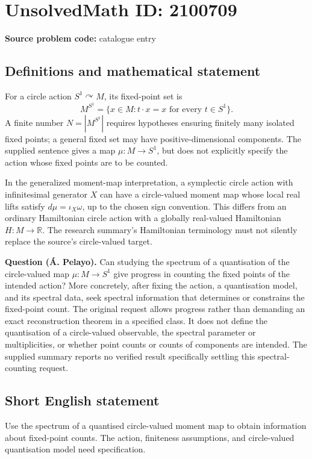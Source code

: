 \documentclass[11pt]{article}
\begin{document}
\section*{UnsolvedMath ID: 2100709}
\textbf{Source problem code:} catalogue entry
\subsection{Definitions and mathematical statement}
For a circle action $S^1\curvearrowright M$, its fixed-point set is
\[
M^{S^1}=\{x\in M:t\cdot x=x\text{ for every }t\in S^1\}.
\]
A finite number $N=|M^{S^1}|$ requires hypotheses ensuring finitely many isolated fixed points; a general fixed set may have positive-dimensional components. The supplied sentence gives a map $\mu:M\to S^1$, but does not explicitly specify the action whose fixed points are to be counted.

In the generalized moment-map interpretation, a symplectic circle action with infinitesimal generator $X$ can have a circle-valued moment map whose local real lifts satisfy $d\mu=\iota_X\omega$, up to the chosen sign convention. This differs from an ordinary Hamiltonian circle action with a globally real-valued Hamiltonian $H:M\to\mathbb R$. The research summary's Hamiltonian terminology must not silently replace the source's circle-valued target.

\textbf{Question (Á. Pelayo).} Can studying the spectrum of a quantisation of the circle-valued map $\mu:M\to S^1$ give progress in counting the fixed points of the intended action? More concretely, after fixing the action, a quantisation model, and its spectral data, seek spectral information that determines or constrains the fixed-point count. The original request allows progress rather than demanding an exact reconstruction theorem in a specified class. It does not define the quantisation of a circle-valued observable, the spectral parameter or multiplicities, or whether point counts or counts of components are intended. The supplied summary reports no verified result specifically settling this spectral-counting request.
\subsection{Short English statement}
Use the spectrum of a quantised circle-valued moment map to obtain information about fixed-point counts. The action, finiteness assumptions, and circle-valued quantisation model need specification.
\end{document}
